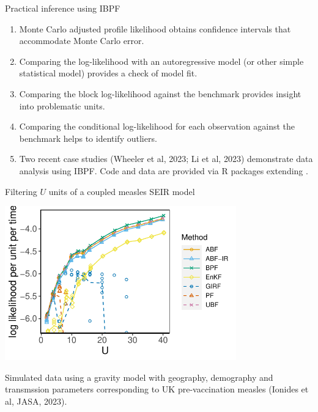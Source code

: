 \documentclass{beamer}
\begin{document}
\begin{frame}{Practical inference using IBPF}
  \begin{enumerate}
  \item Monte Carlo adjusted profile likelihood \citep{ionides17profile} obtains confidence intervals that accommodate Monte Carlo error.

  \item Comparing the log-likelihood with an autoregressive model (or other simple statistical model) provides a check of model fit.

  \item Comparing the block log-likelihood against the benchmark provides insight into problematic units.

    \item Comparing the conditional log-likelihood for each observation against the benchmark helps to identify outliers. 

    \item Two recent case studies (Wheeler et al, 2023; Li et al, 2023) demonstrate data analysis using IBPF. Code and data are provided via R packages extending .
      
  \end{enumerate}
  
  \end{frame}

\begin{frame}{Filtering $U$ units of a coupled measles SEIR model}

\vspace{-1mm}

\begin{center}
\includegraphics[width=10cm]{mscale_loglik_plot-1.pdf}


\end{center}

\vspace{-4mm}

Simulated data using a gravity model with geography, demography and transmssion parameters corresponding to UK pre-vaccination measles (Ionides et al, {JASA}, 2023).


\end{frame}
\end{document}
